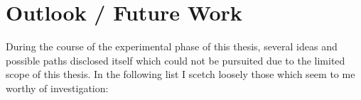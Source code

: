 

\section*{Outlook / Future Work}

During the course of the experimental phase of this thesis, several ideas and possible paths
disclosed itself which could not be pursuited due to the limited scope of this thesis. In the
following list I scetch loosely those which seem to me worthy of investigation:

